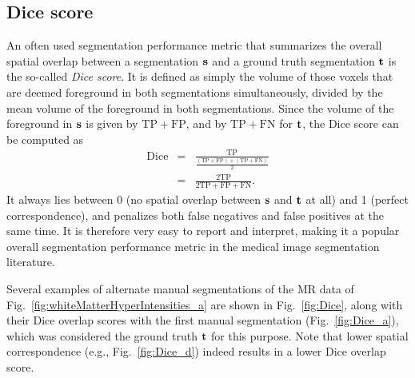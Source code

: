 \documentclass[10pt,twoside]{book}
\begin{document}
\subsection{Dice score}

An often used segmentation performance metric that summarizes the overall spatial overlap between a segmentation $\mathbf{s}$ and a ground truth segmentation $\mathbf{t}$ is the so-called \emph{Dice score}.
It is defined as simply the volume of those voxels that are deemed foreground in both segmentations simultaneously, divided by the mean volume of the foreground in both segmentations. Since the volume
of the foreground in $\mathbf{s}$ is given by $\mathrm{TP}+\mathrm{FP}$, and by $\mathrm{TP}+\mathrm{FN}$ for $\mathbf{t}$, the Dice score can be computed as
\begin{eqnarray*}
  \mathrm{Dice} & = &
  \frac{\mathrm{TP}}{\frac{(\mathrm{TP}+\mathrm{FP}) + (\mathrm{TP}+\mathrm{FN})}{2}} \\
  & = & \frac{2 \mathrm{TP}}{2\mathrm{TP}+\mathrm{FP} + \mathrm{FN}}.
\end{eqnarray*}
It always lies between 0 (no spatial overlap between $\mathbf{s}$ and $\mathbf{t}$ at all) and 1 (perfect correspondence), and penalizes both false negatives and false positives 
at the same time. It is therefore very easy to report and interpret, making it a popular overall segmentation performance metric in the medical image segmentation literature.

Several examples of alternate manual segmentations of the MR data of Fig.~\ref{fig:whiteMatterHyperIntensities_a} are shown in Fig.~\ref{fig:Dice}, along with their Dice overlap scores with the first manual segmentation (Fig.~\ref{fig:Dice_a}), which was considered the ground truth $\mathbf{t}$ for this purpose. Note that lower spatial correspondence (e.g., Fig.~\ref{fig:Dice_d}) indeed results in a lower Dice overlap score.
\end{document}
